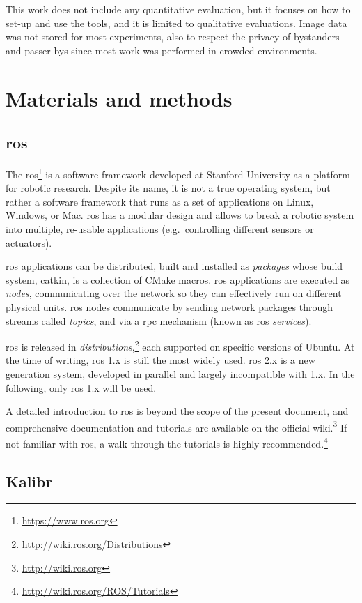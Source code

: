 \documentclass[11pt, letterpaper, twoside]{article}
\begin{document}
This work does not include any quantitative evaluation, but it focuses on how
to set-up and use the tools, and it is limited to qualitative evaluations.
Image data was not stored for most experiments, also to respect the privacy of
bystanders and passer-bys since most work was performed in crowded
environments.

\section{Materials and methods}

\subsection{\acs{ros}}

The \gls{ros}\footnote{\url{https://www.ros.org}} is a software framework
developed at Stanford University as a platform for robotic research. Despite
its name, it is not a true operating system, but rather a software framework
that runs as a set of applications on Linux, Windows, or Mac. \gls{ros} has a
modular design and allows to break a robotic system into multiple, re-usable
applications (e.g.\ controlling different sensors or actuators).

\gls{ros} applications can be distributed, built and installed as
\textit{packages} whose build system, catkin, is a collection of CMake macros.
\gls{ros} applications are executed as \textit{nodes}, communicating over the
network so they can effectively run on different physical units. \gls{ros}
nodes communicate by sending network packages through streams called
\textit{topics}, and via a \gls{rpc} mechanism (known as \gls{ros}
\textit{services}).

\gls{ros} is released in
\textit{distributions},\footnote{\url{http://wiki.ros.org/Distributions}} each
supported on specific versions of Ubuntu. At the time of writing, \gls{ros} 1.x
is still the most widely used. \gls{ros} 2.x is a new generation system,
developed in parallel and largely incompatible with 1.x. In the following, only
\gls{ros} 1.x will be used.

A detailed introduction to \gls{ros} is beyond the scope of the present
document, and comprehensive documentation and tutorials are available on the
official wiki.\footnote{\url{http://wiki.ros.org}} If not familiar with
\gls{ros}, a walk through the tutorials is highly
recommended.\footnote{\url{http://wiki.ros.org/ROS/Tutorials}}

\subsection{Kalibr}\label{sec:kalibr}
\end{document}
